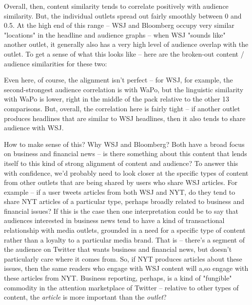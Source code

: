 \documentclass{scrartcl}
\begin{document}

Overall, then, content similarity tends to correlate positively with audience similarity. But, the individual outlets spread out fairly smoothly between 0 and 0.5. At the high end of this range -- WSJ and Bloomberg occupy very similar "locations" in the headline and audience graphs -- when WSJ "sounds like" another outlet, it generally also has a very high level of audience overlap with the outlet. To get a sense of what this looks like -- here are the broken-out content / audience similarities for these two:



Even here, of course, the alignment isn't perfect -- for WSJ, for example, the second-strongest audience correlation is with WaPo, but the linguistic similarity with WaPo is lower, right in the middle of the pack relative to the other 13 comparisons. But, overall, the correlation here is fairly tight -- if another outlet produces headlines that are similar to WSJ headlines, then it also tends to share audience with WSJ.

How to make sense of this? Why WSJ and Bloomberg? Both have a broad focus on business and financial news -- is there something about this content that lends itself to this kind of strong alignment of content and audience? To answer this with confidence, we'd probably need to look closer at the specific types of content from other outlets that are being shared by users who share WSJ articles. For example -- if a user tweets articles from both WSJ and NYT, do they tend to share NYT articles of a particular type, perhaps broadly related to business and financial issues? If this is the case then one interpretation could be to say that audiences interested in business news tend to have a kind of transactional relationship with media outlets, grounded in a need for a specific type of content rather than a loyalty to a particular media brand. That is -- there's a segment of the audience on Twitter that wants business and financial news, but doesn't particularly care where it comes from. So, if NYT produces articles about these issues, then the same readers who engage with WSJ content will a,so engage with these articles from NYT. Business reporting, perhaps, is a kind of "fungible" commodity in the attention marketplace of Twitter -- relative to other types of content, the \textit{article} is more important than the \textit{outlet}?
\end{document}
